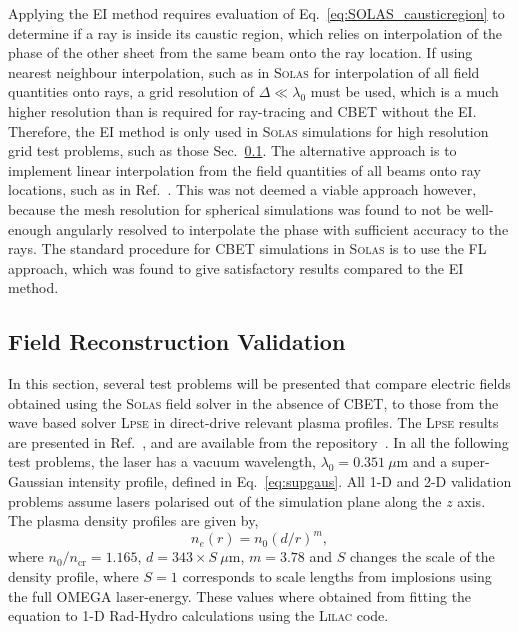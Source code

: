 Applying the \ac{EI} method requires evaluation of Eq.~\ref{eq:SOLAS_causticregion} to determine if a ray is inside its caustic region, which relies on interpolation of the phase of the other sheet from the same beam onto the ray location.
If using nearest neighbour interpolation, such as in \textsc{Solas} for interpolation of all field quantities onto rays, a grid resolution of $\Delta\ll\lambda_0$ must be used, which is a much higher resolution than is required for ray-tracing and \ac{CBET} without the \ac{EI}.
Therefore, the \ac{EI} method is only used in \textsc{Solas} simulations for high resolution grid test problems, such as those Sec.~\ref{sec:SOLAS_field_validation}.
The alternative approach is to implement linear interpolation from the field quantities of all beams onto ray locations, such as in Ref.~\cite{follett_validation_2022}.
This was not deemed a viable approach however, because the mesh resolution for spherical simulations was found to not be well-enough angularly resolved to interpolate the phase with sufficient accuracy to the rays.
The standard procedure for \ac{CBET} simulations in \textsc{Solas} is to use the \ac{FL} approach, which was found to give satisfactory results compared to the \ac{EI} method.

\subsection{Field Reconstruction Validation}%
\label{sec:SOLAS_field_validation}

In this section, several test problems will be presented that compare electric fields obtained using the \textsc{Solas} field solver in the absence of \ac{CBET}, to those from the wave based solver \textsc{Lpse} in direct-drive relevant plasma profiles.
The \textsc{Lpse} results are presented in Ref.~\cite{follett_validation_2022}, and are available from the repository~\cite{follett_lpse_2022}.
In all the following test problems, the laser has a vacuum wavelength, $\lambda_0=0.351\ \mu\text{m}$ and a super-Gaussian intensity profile, defined in Eq.~\ref{eq:supgaus}.
All 1-D and 2-D validation problems assume lasers polarised out of the simulation plane along the $z$ axis.
The plasma density profiles are given by,
\begin{equation}%
    \label{eq:SOLAS_test_ne}
    n_e(r) = n_0 (d/r)^{m},
\end{equation}
where $n_0/n_{\text{cr}} = 1.165$, $d = 343\times S\ \mu\text{m}$, $m=3.78$ and $S$ changes the scale of the density profile, where $S=1$ corresponds to scale lengths from implosions using the full OMEGA laser-energy.
These values where obtained from fitting the equation to 1-D \ac{Rad-Hydro} calculations using the \textsc{Lilac} code.

